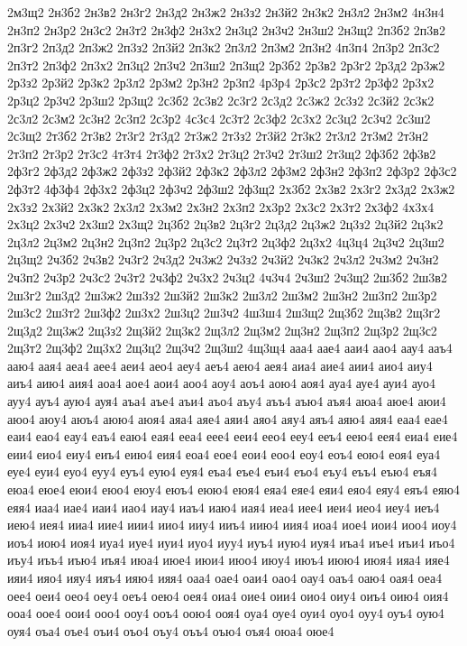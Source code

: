 {2м3щ2
2н3б2
2н3в2
2н3г2
2н3д2
2н3ж2
2н3з2
2н3й2
2н3к2
2н3л2
2н3м2
4н3н4
2н3п2
2н3р2
2н3с2
2н3т2
2н3ф2
2н3х2
2н3ц2
2н3ч2
2н3ш2
2н3щ2
2п3б2
2п3в2
2п3г2
2п3д2
2п3ж2
2п3з2
2п3й2
2п3к2
2п3л2
2п3м2
2п3н2
4п3п4
2п3р2
2п3с2
2п3т2
2п3ф2
2п3х2
2п3ц2
2п3ч2
2п3ш2
2п3щ2
2р3б2
2р3в2
2р3г2
2р3д2
2р3ж2
2р3з2
2р3й2
2р3к2
2р3л2
2р3м2
2р3н2
2р3п2
4р3р4
2р3с2
2р3т2
2р3ф2
2р3х2
2р3ц2
2р3ч2
2р3ш2
2р3щ2
2с3б2
2с3в2
2с3г2
2с3д2
2с3ж2
2с3з2
2с3й2
2с3к2
2с3л2
2с3м2
2с3н2
2с3п2
2с3р2
4с3с4
2с3т2
2с3ф2
2с3х2
2с3ц2
2с3ч2
2с3ш2
2с3щ2
2т3б2
2т3в2
2т3г2
2т3д2
2т3ж2
2т3з2
2т3й2
2т3к2
2т3л2
2т3м2
2т3н2
2т3п2
2т3р2
2т3с2
4т3т4
2т3ф2
2т3х2
2т3ц2
2т3ч2
2т3ш2
2т3щ2
2ф3б2
2ф3в2
2ф3г2
2ф3д2
2ф3ж2
2ф3з2
2ф3й2
2ф3к2
2ф3л2
2ф3м2
2ф3н2
2ф3п2
2ф3р2
2ф3с2
2ф3т2
4ф3ф4
2ф3х2
2ф3ц2
2ф3ч2
2ф3ш2
2ф3щ2
2х3б2
2х3в2
2х3г2
2х3д2
2х3ж2
2х3з2
2х3й2
2х3к2
2х3л2
2х3м2
2х3н2
2х3п2
2х3р2
2х3с2
2х3т2
2х3ф2
4х3х4
2х3ц2
2х3ч2
2х3ш2
2х3щ2
2ц3б2
2ц3в2
2ц3г2
2ц3д2
2ц3ж2
2ц3з2
2ц3й2
2ц3к2
2ц3л2
2ц3м2
2ц3н2
2ц3п2
2ц3р2
2ц3с2
2ц3т2
2ц3ф2
2ц3х2
4ц3ц4
2ц3ч2
2ц3ш2
2ц3щ2
2ч3б2
2ч3в2
2ч3г2
2ч3д2
2ч3ж2
2ч3з2
2ч3й2
2ч3к2
2ч3л2
2ч3м2
2ч3н2
2ч3п2
2ч3р2
2ч3с2
2ч3т2
2ч3ф2
2ч3х2
2ч3ц2
4ч3ч4
2ч3ш2
2ч3щ2
2ш3б2
2ш3в2
2ш3г2
2ш3д2
2ш3ж2
2ш3з2
2ш3й2
2ш3к2
2ш3л2
2ш3м2
2ш3н2
2ш3п2
2ш3р2
2ш3с2
2ш3т2
2ш3ф2
2ш3х2
2ш3ц2
2ш3ч2
4ш3ш4
2ш3щ2
2щ3б2
2щ3в2
2щ3г2
2щ3д2
2щ3ж2
2щ3з2
2щ3й2
2щ3к2
2щ3л2
2щ3м2
2щ3н2
2щ3п2
2щ3р2
2щ3с2
2щ3т2
2щ3ф2
2щ3х2
2щ3ц2
2щ3ч2
2щ3ш2
4щ3щ4
ааа4
аае4
ааи4
аао4
аау4
ааъ4
ааю4
аая4
аеа4
аее4
аеи4
аео4
аеу4
аеъ4
аею4
аея4
аиа4
аие4
аии4
аио4
аиу4
аиъ4
аию4
аия4
аоа4
аое4
аои4
аоо4
аоу4
аоъ4
аою4
аоя4
ауа4
ауе4
ауи4
ауо4
ауу4
ауъ4
аую4
ауя4
аъа4
аъе4
аъи4
аъо4
аъу4
аъъ4
аъю4
аъя4
аюа4
аюе4
аюи4
аюо4
аюу4
аюъ4
аюю4
аюя4
аяа4
аяе4
аяи4
аяо4
аяу4
аяъ4
аяю4
аяя4
еаа4
еае4
еаи4
еао4
еау4
еаъ4
еаю4
еая4
ееа4
еее4
ееи4
еео4
ееу4
ееъ4
еею4
еея4
еиа4
еие4
еии4
еио4
еиу4
еиъ4
еию4
еия4
еоа4
еое4
еои4
еоо4
еоу4
еоъ4
еою4
еоя4
еуа4
еуе4
еуи4
еуо4
еуу4
еуъ4
еую4
еуя4
еъа4
еъе4
еъи4
еъо4
еъу4
еъъ4
еъю4
еъя4
еюа4
еюе4
еюи4
еюо4
еюу4
еюъ4
еюю4
еюя4
еяа4
еяе4
еяи4
еяо4
еяу4
еяъ4
еяю4
еяя4
иаа4
иае4
иаи4
иао4
иау4
иаъ4
иаю4
иая4
иеа4
иее4
иеи4
иео4
иеу4
иеъ4
иею4
иея4
ииа4
иие4
иии4
иио4
ииу4
ииъ4
иию4
иия4
иоа4
иое4
иои4
иоо4
иоу4
иоъ4
иою4
иоя4
иуа4
иуе4
иуи4
иуо4
иуу4
иуъ4
иую4
иуя4
иъа4
иъе4
иъи4
иъо4
иъу4
иъъ4
иъю4
иъя4
июа4
июе4
июи4
июо4
июу4
июъ4
июю4
июя4
ияа4
ияе4
ияи4
ияо4
ияу4
ияъ4
ияю4
ияя4
оаа4
оае4
оаи4
оао4
оау4
оаъ4
оаю4
оая4
оеа4
оее4
оеи4
оео4
оеу4
оеъ4
оею4
оея4
оиа4
оие4
оии4
оио4
оиу4
оиъ4
оию4
оия4
ооа4
оое4
оои4
ооо4
ооу4
ооъ4
оою4
ооя4
оуа4
оуе4
оуи4
оуо4
оуу4
оуъ4
оую4
оуя4
оъа4
оъе4
оъи4
оъо4
оъу4
оъъ4
оъю4
оъя4
оюа4
оюе4
}
